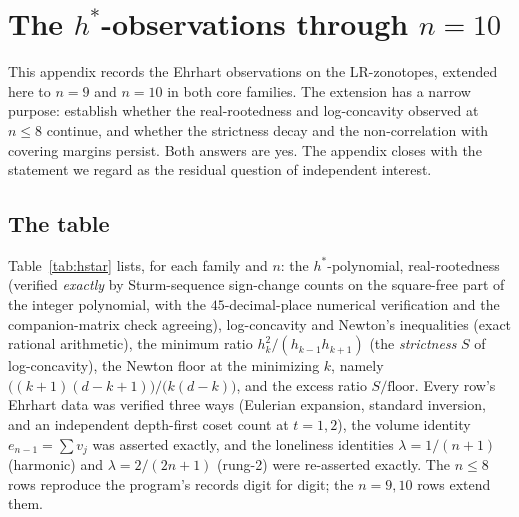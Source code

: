 
\appendix
\section{The \boldmath$h^*$-observations through \boldmath$n=10$}
\label{sec:hstar}

This appendix records the Ehrhart observations on the LR-zonotopes,
extended here to $n=9$ and $n=10$ in both core families. The
extension has a narrow purpose:
establish whether the real-rootedness and log-concavity observed at
$n\le8$ continue, and whether the strictness decay and the
non-correlation with covering margins persist. Both answers are yes. The
appendix closes with the statement we regard as the residual question of
independent interest.

\subsection{The table}

Table~\ref{tab:hstar} lists, for each family and $n$: the
$h^*$-polynomial, real-rootedness (verified \emph{exactly} by
Sturm-sequence sign-change counts on the square-free part of the integer
polynomial, with the $45$-decimal-place numerical verification and
the companion-matrix check agreeing), log-concavity and Newton's inequalities (exact rational
arithmetic), the minimum ratio $h_k^2/(h_{k-1}h_{k+1})$ (the
\emph{strictness} $S$ of log-concavity), the Newton floor at the
minimizing $k$, namely
$\bigl((k{+}1)(d{-}k{+}1)\bigr)/\bigl(k(d{-}k)\bigr)$,
and the excess ratio $S/\text{floor}$. Every row's Ehrhart data was
verified three ways (Eulerian expansion, standard inversion, and an
independent depth-first coset count at $t=1,2$), the volume identity
$e_{n-1}=\sum v_j$ was asserted exactly, and the loneliness identities
$\lambda=1/(n{+}1)$ (harmonic) and $\lambda=2/(2n{+}1)$ (rung-2) were
re-asserted exactly. The $n\le8$ rows reproduce the program's
records digit for digit; the $n=9,10$ rows extend them.

